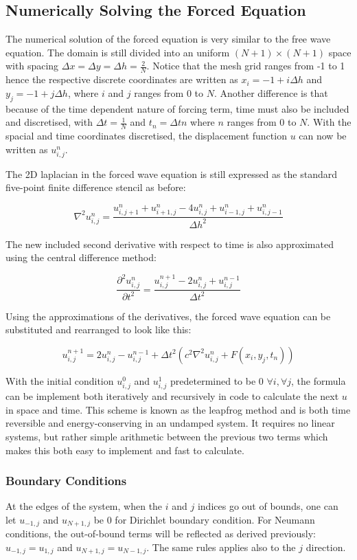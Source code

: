 \subsection{Numerically Solving the Forced Equation}
The numerical solution of the forced equation is very similar to the free wave equation. The domain is still divided into an uniform $(N+1)\times(N+1)$ space with spacing $\Delta x = \Delta y = \Delta h = \frac{2}{N}$. Notice that the mesh grid ranges from -1 to 1 hence the respective discrete coordinates are written as $x_i = -1 + i\Delta h$ and $y_j = -1 + j\Delta h$, where $i$ and $j$ ranges from 0 to $N$. Another difference is that because of the time dependent nature of forcing term, time must also be included and discretised, with $\Delta t = \frac{1}{N}$ and $t_n = \Delta tn$ where $n$ ranges from 0 to $N$. With the spacial and time coordinates discretised, the displacement function $u$ can now be written as $u^{n}_{i,j}$. 

The 2D laplacian in the forced wave equation is still expressed as the standard five-point finite difference stencil as before:

\begin{equation}
    \nabla^2u^{n}_{i,j} = \frac{u^{n}_{i,j+1}+u^{n}_{i+1,j}-4u^{n}_{i,j}+u^{n}_{i-1,j}+u^{n}_{i,j-1}}{\Delta h^2}
\end{equation}

The new included second derivative with respect to time is also approximated using the central difference method:

\begin{equation}
    \frac{\partial^2u^{n}_{i,j}}{\partial t^2} = \frac{u^{n+1}_{i,j} - 2u^{n}_{i,j} + u^{n-1}_{i,j}}{\Delta t^2}
\end{equation}

Using the approximations of the derivatives, the forced wave equation can be substituted and rearranged to look like this:

\begin{equation}
    u^{n+1}_{i,j} = 2u^{n}_{i,j} - u^{n-1}_{i,j} + \Delta t^2(c^2\nabla^2u^{n}_{i,j} + F(x_i,y_j,t_n))
\end{equation}

With the initial condition $u^0_{i,j}$ and $u^1_{i,j}$ predetermined to be 0 $\forall i, \forall j$, the formula can be implement both iteratively and recursively in code to calculate the next $u$ in space and time. This scheme is known as the leapfrog method \autocite{strang2006wave} and is both time reversible and energy-conserving in an undamped system. It requires no linear systems, but rather simple arithmetic between the previous two terms which makes this both easy to implement and fast to calculate.

\subsubsection{Boundary Conditions}
At the edges of the system, when the $i$ and $j$ indices go out of bounds, one can let $u_{-1,j}$ and $u_{N+1,j}$ be 0 for Dirichlet boundary condition. For Neumann conditions, the out-of-bound terms will be reflected as derived previously: $u_{-1,j} = u_{1,j}$  and $u_{N+1,j} = u_{N-1,j}$. The same rules applies also to the $j$ direction.